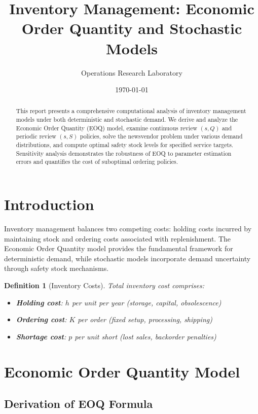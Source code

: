 \documentclass[a4paper, 11pt]{article}
\title{Inventory Management: Economic Order Quantity and Stochastic Models}
\author{Operations Research Laboratory}
\date{\today}
\newtheorem{definition}{Definition}[section]
\begin{document}
\maketitle

\begin{abstract}
This report presents a comprehensive computational analysis of inventory management models
under both deterministic and stochastic demand. We derive and analyze the Economic Order
Quantity (EOQ) model, examine continuous review $(s,Q)$ and periodic review $(s,S)$ policies,
solve the newsvendor problem under various demand distributions, and compute optimal safety
stock levels for specified service targets. Sensitivity analysis demonstrates the robustness
of EOQ to parameter estimation errors and quantifies the cost of suboptimal ordering policies.
\end{abstract}

\section{Introduction}

Inventory management balances two competing costs: holding costs incurred by maintaining
stock and ordering costs associated with replenishment. The Economic Order Quantity model
provides the fundamental framework for deterministic demand, while stochastic models
incorporate demand uncertainty through safety stock mechanisms.

\begin{definition}[Inventory Costs]
Total inventory cost comprises:
\begin{itemize}
\item \textbf{Holding cost}: $h$ per unit per year (storage, capital, obsolescence)
\item \textbf{Ordering cost}: $K$ per order (fixed setup, processing, shipping)
\item \textbf{Shortage cost}: $p$ per unit short (lost sales, backorder penalties)
\end{itemize}
\end{definition}

\section{Economic Order Quantity Model}

\subsection{Derivation of EOQ Formula}
\end{document}
